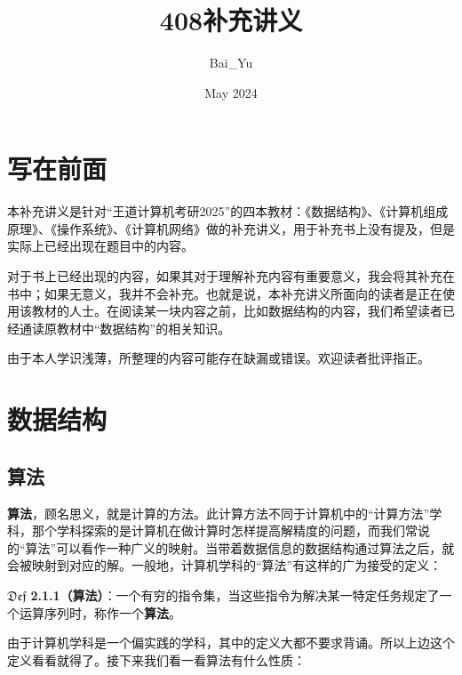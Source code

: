\documentclass[a5paper]{ctexart}
\title{408补充讲义}
\author{Bai\_Yu}
\date{May 2024}
\newcommand \ding[2]{$\mathfrak{Def}$ \textbf{#1}：#2}
\begin{document}
	
	\maketitle
	\thispagestyle{empty}
	\newpage
	\setcounter{page}{1}
	\tableofcontents
	
	\newpage
	\setcounter{page}{1}
		\section{写在前面}
		
		本补充讲义是针对“王道计算机考研2025”的四本教材：《数据结构》、《计算机组成原理》、《操作系统》、《计算机网络》做的补充讲义，用于补充书上没有提及，但是实际上已经出现在题目中的内容。
		
		对于书上已经出现的内容，如果其对于理解补充内容有重要意义，我会将其补充在书中；如果无意义，我并不会补充。也就是说，本补充讲义所面向的读者是正在使用该教材的人士。在阅读某一块内容之前，比如数据结构的内容，我们希望读者已经通读原教材中“数据结构”的相关知识。
		
		由于本人学识浅薄，所整理的内容可能存在缺漏或错误。欢迎读者批评指正。
		
		
		
		\newpage
		
		\section{数据结构}
		
		\subsection{算法}
		
		\textbf{算法}，顾名思义，就是计算的方法。此计算方法不同于计算机中的“计算方法”学科，那个学科探索的是计算机在做计算时怎样提高解精度的问题，而我们常说的“算法”可以看作一种广义的映射。当带着数据信息的数据结构通过算法之后，就会被映射到对应的解。一般地，计算机学科的“算法”有这样的广为接受的定义：
		
		\vspace{12pt}
		
		\ding{2.1.1（算法）}{一个有穷的指令集，当这些指令为解决某一特定任务规定了一个运算序列时，称作一个\textbf{算法}。}

		\vspace{12pt}
				
		由于计算机学科是一个偏实践的学科，其中的定义大都不要求背诵。所以上边这个定义看看就得了。接下来我们看一看算法有什么性质：
		
		\vspace{12pt}
		
\end{document}
